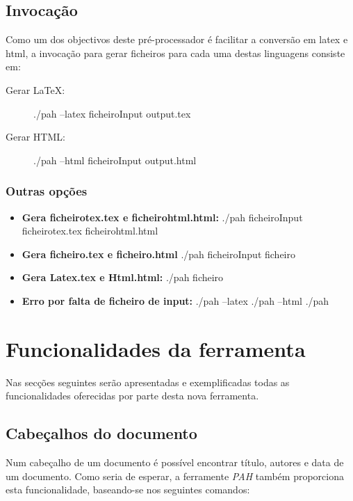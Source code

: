 \documentclass[11pt,a4paper]{article}
\begin{document}
\subsection{Invocação}
Como um dos objectivos deste pré-processador é facilitar a conversão em latex e html, a invocação para gerar ficheiros para cada uma destas linguagens consiste em:  \\ 

\begin{description}
    \item[Gerar LaTeX:] 
       ./pah --latex ficheiroInput output.tex
    \item[Gerar HTML:] 
       ./pah --html ficheiroInput output.html
\end{description}


 \newpage 
\subsubsection{Outras opções}
\begin{itemize}
    \item \textbf{Gera ficheirotex.tex e ficheirohtml.html:} 
    ./pah ficheiroInput ficheirotex.tex ficheirohtml.html    
    \item \textbf{Gera ficheiro.tex e ficheiro.html} 
    ./pah ficheiroInput ficheiro
    \item \textbf{Gera Latex.tex e Html.html:}
    ./pah ficheiro
    \item \textbf{Erro por falta de ficheiro de input:}
    ./pah --latex
    ./pah --html
    ./pah
\end{itemize}


 \newpage 

\section{Funcionalidades da ferramenta}
Nas secções seguintes serão apresentadas e exemplificadas todas as funcionalidades oferecidas por parte desta nova ferramenta. \\  
 

\subsection{Cabeçalhos do documento}

Num cabeçalho de um documento é possível encontrar título, autores e data de um documento. Como seria de esperar, a ferramente \textit{PAH} também proporciona esta funcionalidade, baseando-se nos seguintes comandos: \\ 
\end{document}
